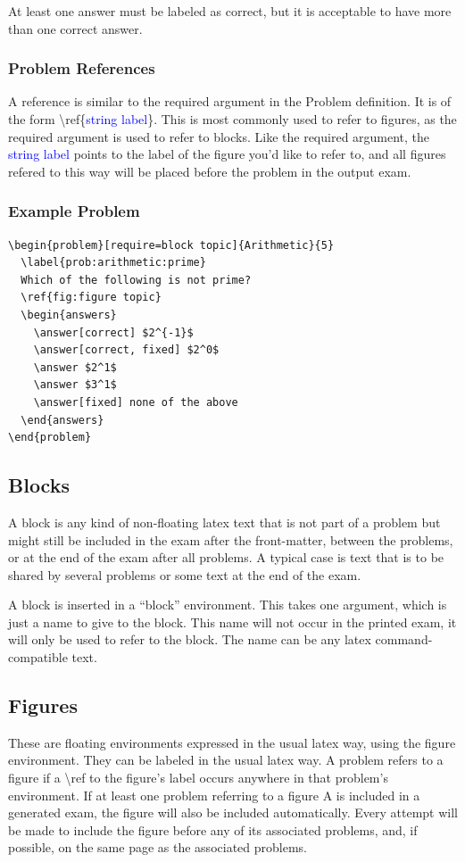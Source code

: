 \documentclass{article}
\begin{document}
At least one answer must be labeled as correct, but it is acceptable to have more than one correct answer.

\subsubsection{Problem References}
A reference is similar to the required argument in the Problem definition. It is of the form \textbackslash{ref}\{\textcolor{blue}{string label}\}. This is most commonly used to refer to figures, as the required argument is used to refer to blocks. Like the required argument, the \textcolor{blue}{string label} points to the label of the figure you'd like to refer to, and all figures refered to this way will be placed before the problem in the output exam.

\subsubsection{Example Problem}
\begin{verbatim}
\begin{problem}[require=block topic]{Arithmetic}{5}
  \label{prob:arithmetic:prime}
  Which of the following is not prime?
  \ref{fig:figure topic}
  \begin{answers}
    \answer[correct] $2^{-1}$
    \answer[correct, fixed] $2^0$
    \answer $2^1$
    \answer $3^1$
    \answer[fixed] none of the above
  \end{answers}
\end{problem}
\end{verbatim}


\subsection{Blocks}
A block is any kind of non-floating latex text that is not part of a problem but might still be included in the exam after the front-matter, between the problems, or at the end of the exam after all problems. A typical case is text that is to be shared by several problems or some text at the end of the exam.

A block is inserted in a ``block'' environment. This takes one argument, which is just a name to give to the block. This name will not occur in the printed exam, it will only be used to refer to the block. The name can be any latex command-compatible text.

\subsection{Figures}
These are floating environments expressed in the usual latex way, using the figure environment. They can be labeled in the usual latex way. A problem refers to a figure if a \textbackslash{ref} to the figure's label occurs anywhere in that problem's environment. If at least one problem referring to a figure A is included in a generated exam, the figure will also be included automatically. Every attempt will be made to include the figure before any of its associated problems, and, if possible, on the same page as the associated problems.
\end{document}

